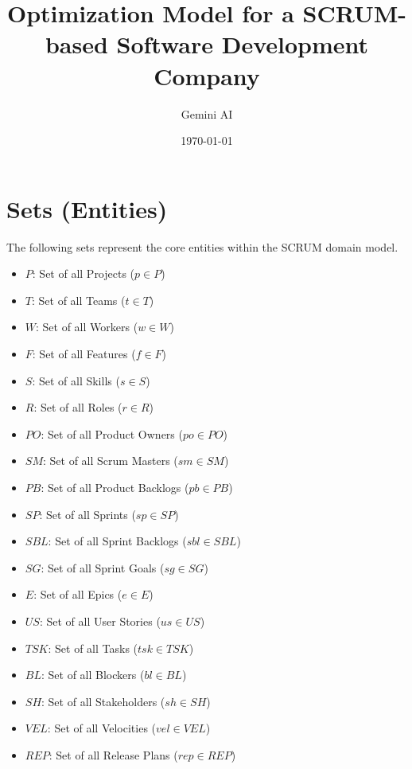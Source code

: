\documentclass{article}
\title{Optimization Model for a SCRUM-based Software Development Company}
\author{Gemini AI}
\date{\today}
\begin{document}
\maketitle
\tableofcontents
\newpage

\section{Sets (Entities)}
The following sets represent the core entities within the SCRUM domain model.
\begin{itemize}
    \item $P$: Set of all Projects ($p \in P$)
    \item $T$: Set of all Teams ($t \in T$)
    \item $W$: Set of all Workers ($w \in W$)
    \item $F$: Set of all Features ($f \in F$)
    \item $S$: Set of all Skills ($s \in S$)
    \item $R$: Set of all Roles ($r \in R$)
    \item $PO$: Set of all Product Owners ($po \in PO$)
    \item $SM$: Set of all Scrum Masters ($sm \in SM$)
    \item $PB$: Set of all Product Backlogs ($pb \in PB$)
    \item $SP$: Set of all Sprints ($sp \in SP$)
    \item $SBL$: Set of all Sprint Backlogs ($sbl \in SBL$)
    \item $SG$: Set of all Sprint Goals ($sg \in SG$)
    \item $E$: Set of all Epics ($e \in E$)
    \item $US$: Set of all User Stories ($us \in US$)
    \item $TSK$: Set of all Tasks ($tsk \in TSK$)
    \item $BL$: Set of all Blockers ($bl \in BL$)
    \item $SH$: Set of all Stakeholders ($sh \in SH$)
    \item $VEL$: Set of all Velocities ($vel \in VEL$)
    \item $REP$: Set of all Release Plans ($rep \in REP$)
\end{itemize}
\end{document}
